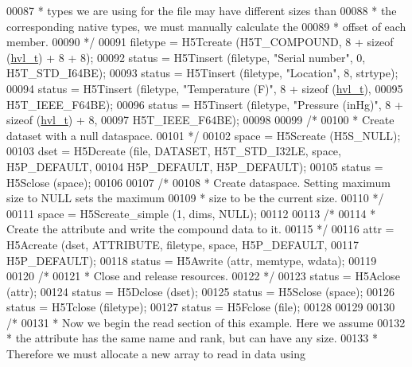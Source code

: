 \begin{DoxyCode}
00087 \textcolor{comment}{     * types we are using for the file may have different sizes than}
00088 \textcolor{comment}{     * the corresponding native types, we must manually calculate the}
00089 \textcolor{comment}{     * offset of each member.}
00090 \textcolor{comment}{     */}
00091     filetype = H5Tcreate (H5T\_COMPOUND, 8 + \textcolor{keyword}{sizeof} (\hyperlink{structhvl__t}{hvl\_t}) + 8 + 8);
00092     status = H5Tinsert (filetype, \textcolor{stringliteral}{"Serial number"}, 0, H5T\_STD\_I64BE);
00093     status = H5Tinsert (filetype, \textcolor{stringliteral}{"Location"}, 8, strtype);
00094     status = H5Tinsert (filetype, \textcolor{stringliteral}{"Temperature (F)"}, 8 + \textcolor{keyword}{sizeof} (\hyperlink{structhvl__t}{hvl\_t}),
00095                 H5T\_IEEE\_F64BE);
00096     status = H5Tinsert (filetype, \textcolor{stringliteral}{"Pressure (inHg)"}, 8 + \textcolor{keyword}{sizeof} (\hyperlink{structhvl__t}{hvl\_t}) + 8,
00097                 H5T\_IEEE\_F64BE);
00098 
00099     \textcolor{comment}{/*}
00100 \textcolor{comment}{     * Create dataset with a null dataspace.}
00101 \textcolor{comment}{     */}
00102     space = H5Screate (H5S\_NULL);
00103     dset = H5Dcreate (file, DATASET, H5T\_STD\_I32LE, space, H5P\_DEFAULT,
00104                 H5P\_DEFAULT, H5P\_DEFAULT);
00105     status = H5Sclose (space);
00106 
00107     \textcolor{comment}{/*}
00108 \textcolor{comment}{     * Create dataspace.  Setting maximum size to NULL sets the maximum}
00109 \textcolor{comment}{     * size to be the current size.}
00110 \textcolor{comment}{     */}
00111     space = H5Screate\_simple (1, dims, NULL);
00112 
00113     \textcolor{comment}{/*}
00114 \textcolor{comment}{     * Create the attribute and write the compound data to it.}
00115 \textcolor{comment}{     */}
00116     attr = H5Acreate (dset, ATTRIBUTE, filetype, space, H5P\_DEFAULT,
00117                 H5P\_DEFAULT);
00118     status = H5Awrite (attr, memtype, wdata);
00119 
00120     \textcolor{comment}{/*}
00121 \textcolor{comment}{     * Close and release resources.}
00122 \textcolor{comment}{     */}
00123     status = H5Aclose (attr);
00124     status = H5Dclose (dset);
00125     status = H5Sclose (space);
00126     status = H5Tclose (filetype);
00127     status = H5Fclose (file);
00128 
00129 
00130     \textcolor{comment}{/*}
00131 \textcolor{comment}{     * Now we begin the read section of this example.  Here we assume}
00132 \textcolor{comment}{     * the attribute has the same name and rank, but can have any size.}
00133 \textcolor{comment}{     * Therefore we must allocate a new array to read in data using}

\end{DoxyCode}
